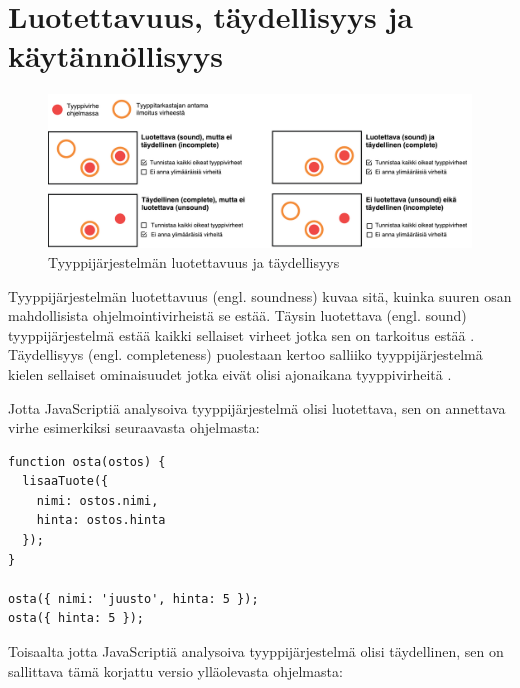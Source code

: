 \section{Luotettavuus, täydellisyys ja käytännöllisyys}

\begin{figure}
\includegraphics[width=\textwidth]{images/soundness_completeness2.pdf}
\caption{Tyyppijärjestelmän luotettavuus ja täydellisyys}
\end{figure}

Tyyppijärjestelmän luotettavuus (engl. soundness) kuvaa sitä, kuinka suuren osan
mahdollisista ohjelmointivirheistä se estää. Täysin luotettava (engl. sound)
tyyppijärjestelmä estää kaikki sellaiset virheet jotka sen on tarkoitus
estää \cite{CSE_ProgrammingLanguages}. Täydellisyys (engl. completeness)
puolestaan kertoo salliiko tyyppijärjestelmä kielen sellaiset ominaisuudet
jotka eivät olisi ajonaikana tyyppivirheitä \cite{TypesAndProgrammingLanguages, CSE_ProgrammingLanguages}.

Jotta JavaScriptiä analysoiva tyyppijärjestelmä olisi luotettava, sen on
annettava virhe esimerkiksi seuraavasta ohjelmasta:

\begin{minipage}{\linewidth}
\begin{lstlisting}[caption={Virheellinen JavaScript-ohjelma: Lisätyllä tuotteella ei ole nimeä.}]
function osta(ostos) {
  lisaaTuote({
    nimi: ostos.nimi,
    hinta: ostos.hinta
  });
}

osta({ nimi: 'juusto', hinta: 5 });
osta({ hinta: 5 });
\end{lstlisting}
\label{fig:soundness_test}
\end{minipage}

Toisaalta jotta JavaScriptiä analysoiva tyyppijärjestelmä olisi täydellinen,
sen on sallittava tämä korjattu versio ylläolevasta ohjelmasta:

